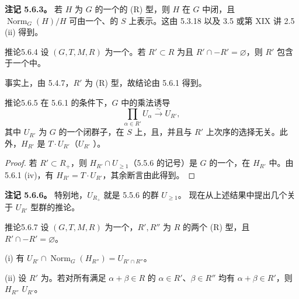 \textbf{注记 5.6.3。} 若 $H$ 为 $G$ 的一个的 (R) 型，则 $H$ 在 $G$ 中闭，且 $\operatorname{Norm}_G(H)/H$ 可由一个、的 $S$ 上表示。这由 5.3.18 以及 3.5 或第 XIX 讲 2.5 (ii) 得到。
\begin{SGAresult}{推论}{5.6.4}
设 $(G,T,M,R)$ 为一个。若 $R'\subset R$ 为且 $R'\cap -R'=\varnothing$，则 $R'$ 包含于一个中。
\end{SGAresult}
事实上，由 5.4.7，$R'$ 为 (R) 型，故结论由 5.6.1 得到。
\begin{SGAresult}{推论}{5.6.5}
在 5.6.1 的条件下，$G$ 中的乘法诱导
\[\prod_{\alpha\in R'}U_\alpha\xrightarrow{\sim}U_{R'},\]
其中 $U_{R'}$ 为 $G$ 的一个闭群子，在 $S$ 上，且，并且与 $R'$ 上次序的选择无关。此外，$H_{R'}$ 是 $T\cdot U_{R'}$（$U_{R'}$ ）。
\end{SGAresult}
\begin{proof}
若 $R'\subset R_+$，则 $H_{R'}\cap U_{\ge1}$（5.5.6 的记号）是 $G$ 的一个，在 $H_{R'}$ 中。由 5.6.1 (iv)，有 $H_{R'}=T\cdot U_{R'}$，其余断言由此得到。
\end{proof}
\textbf{注记 5.6.6。} 特别地，$U_{R_+}$ 就是 5.5.6 的群 $U_{\ge1}$。
现在从上述结果中提出几个关于 $U_{R'}$ 型群的推论。
\begin{SGAresult}{推论}{5.6.7}
设 $(G,T,M,R)$ 为一个，$R',R''$ 为 $R$ 的两个 (R) 型，且 $R'\cap -R'=\varnothing$。

(i) 有 $U_{R'}\cap\operatorname{Norm}_G(H_{R''})=U_{R'\cap R''}$。

(ii) 设 $R'$ 为。若对所有满足 $\alpha+\beta\in R$ 的 $\alpha\in R'$、$\beta\in R''$ 均有 $\alpha+\beta\in R'$，则 $H_{R''}$  $U_{R'}$。
\end{SGAresult}

